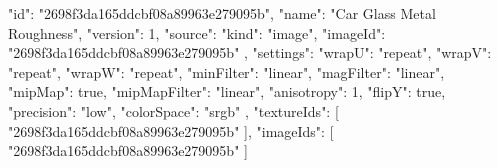 {
  "id": "2698f3da165ddcbf08a89963e279095b",
  "name": "Car Glass Metal Roughness",
  "version": 1,
  "source": {
    "kind": "image",
    "imageId": "2698f3da165ddcbf08a89963e279095b"
  },
  "settings": {
    "wrapU": "repeat",
    "wrapV": "repeat",
    "wrapW": "repeat",
    "minFilter": "linear",
    "magFilter": "linear",
    "mipMap": true,
    "mipMapFilter": "linear",
    "anisotropy": 1,
    "flipY": true,
    "precision": "low",
    "colorSpace": "srgb"
  },
  "textureIds": [
    "2698f3da165ddcbf08a89963e279095b"
  ],
  "imageIds": [
    "2698f3da165ddcbf08a89963e279095b"
  ]
}
